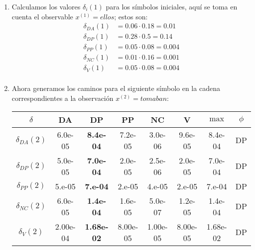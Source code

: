 \begin{enumerate}
     \item Calculamos los valores $\delta_i(1)$ para los símbolos iniciales, aquí se toma en cuenta el observable $x^{(1)} = ellos$; estos son:
     \begin{align*}
         \delta_{DA}(1) &= 0.06 \cdot 0.18 = 0.01\\
         \delta_{DP}(1) &= 0.28 \cdot 0.5 = 0.14 \\
         \delta_{PP}(1) &= 0.05 \cdot 0.08 = 0.004 \\
         \delta_{NC}(1) &= 0.01 \cdot 0.16 = 0.001 \\
         \delta_{V}(1) &= 0.05 \cdot 0.08 = 0.004\\
     \end{align*}

     \item Ahora generamos los caminos para el siguiente símbolo en la cadena correspondientes a la observación $x^{(2)} = tomaban$:
     \begin{center}
        \small
         \begin{tabular}{c c c c c c | c c} \hline
            $\delta$ & DA & DP & PP & NC & V & $\max$ & $\phi$\\ \hline
            $\delta_{DA}(2)$  & 6.0e-05 & \textbf{8.4e-04} & 7.2e-05 & 3.0e-06 & 9.6e-05 & 8.4e-04 & DP\\
            $\delta_{DP}(2)$  & 5.0e-05 & \textbf{7.0e-04} & 2.0e-05 & 2.5e-06 & 2.0e-05 & 7.0e-04 & DP \\
            $\delta_{PP}(2)$  & 5.e-05 & \textbf{7.e-04} & 2.e-05 & 4.e-05 & 2.e-05 & 7.e-04 & DP \\
            $\delta_{NC}(2)$  & 6.0e-05 &  \textbf{1.4e-04} & 1.6e-05 & 5.0e-07 & 1.2e-05 & 1.4e-04 & DP \\
            $\delta_{V}(2)$  & 2.00e-04 & \textbf{1.68e-02} & 8.00e-05 & 1.00e-05 & 8.00e-05 & 1.68e-02 & DP\\ \hline
         \end{tabular}
     \end{center}


\end{enumerate}
